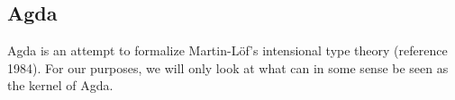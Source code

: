 \subsection{Agda}

Agda is an attempt to formalize Martin-Löf's intensional type theory (reference 1984).
For our purposes, we will only look at what can in some sense be seen as the
kernel of Agda.

